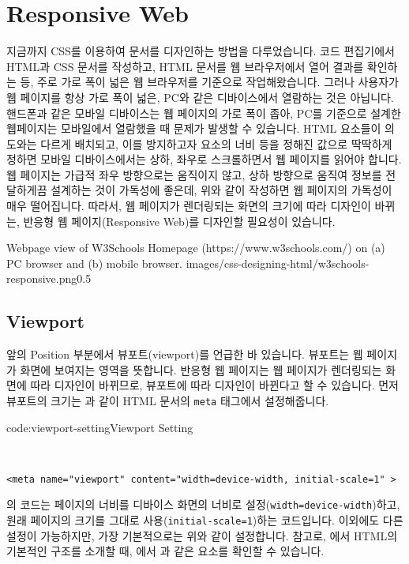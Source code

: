 \section{Responsive Web} \label{sect:responsive-web}

지금까지 CSS를 이용하여 문서를 디자인하는 방법을 다루었습니다. 코드 편집기에서 HTML과 CSS 문서를 작성하고, HTML 문서를 웹 브라우저에서 열어 결과를 확인하는 등, 주로 가로 폭이 넓은 웹 브라우저를 기준으로 작업해왔습니다. 그러나 사용자가 웹 페이지를 항상 가로 폭이 넓은, PC와 같은 디바이스에서 열람하는 것은 아닙니다. 핸드폰과 같은 모바일 디바이스는 웹 페이지의 가로 폭이 좁아, PC를 기준으로 설계한 웹페이지는 모바일에서 열람했을 때 문제가 발생할 수 있습니다. HTML 요소들이 의도와는 다르게 배치되고, 이를 방지하고자 요소의 너비 등을 정해진 값으로 딱딱하게 정하면 모바일 디바이스에서는 상하, 좌우로 스크롤하면서 웹 페이지를 읽어야 합니다. 웹 페이지는 가급적 좌우 방향으로는 움직이지 않고, 상하 방향으로 움직여 정보를 전달하게끔 설계하는 것이 가독성에 좋은데, 위와 같이 작성하면 웹 페이지의 가독성이 매우 떨어집니다. 따라서, 웹 페이지가 렌더링되는 화면의 크기에 따라 디자인이 바뀌는, 반응형 웹 페이지(Responsive Web)를 디자인할 필요성이 있습니다.

    {Webpage view of W3Schools Homepage (https://www.w3schools.com/) on (a) PC browser and (b) mobile browser.}
    {images/css-designing-html/w3schools-responsive.png}{0.5}

\subsection*{Viewport}
앞의  Position 부분에서 뷰포트(viewport)를 언급한 바 있습니다. 뷰포트는 웹 페이지가 화면에 보여지는 영역을 뜻합니다. 반응형 웹 페이지는 웹 페이지가 렌더링되는 화면에 따라 디자인이 바뀌므로, 뷰포트에 따라 디자인이 바뀐다고 할 수 있습니다. 먼저 뷰포트의 크기는 과 같이 HTML 문서의 \verb|meta| 태그에서 설정해줍니다. 

\begin{codeenv}{code:viewport-setting}{Viewport Setting}\begin{verbatim}


<meta name="viewport" content="width=device-width, initial-scale=1" >
\end{verbatim}
\end{codeenv}

의 코드는 페이지의 너비를 디바이스 화면의 너비로 설정(\verb|width=device-width|)하고, 원래 페이지의 크기를 그대로 사용(\verb|initial-scale=1|)하는 코드입니다. 이외에도 다른 설정이 가능하지만, 가장 기본적으로는 위와 같이 설정합니다. 참고로, 에서 HTML의 기본적인 구조를 소개할 때, 에서 과 같은 요소를 확인할 수 있습니다.

